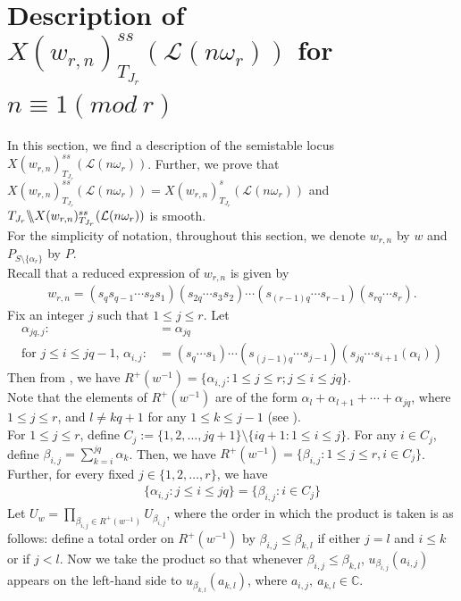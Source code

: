 \documentclass[12pt,reqno]{amsart}
\numberwithin{equation}{section}
\theoremstyle{definition}
\newcommand{\GmodX}[3]{#1 \backslash\mkern-6mu\backslash #2^{ss}_{#1}(#3)}
\begin{document}
	 \section{Description of  $X(w_{r,n})^{ss}_{T_{J_{r}}}(\mathcal{L}(n\omega_{r}))$ for $n\equiv1 (mod \ r)$} In this section, we find a description of the semistable locus $X(w_{r,n})^{ss}_{T_{J_{r}}}(\mathcal{L}(n\omega_{r}))$. Further, we prove that $X(w_{r,n})^{ss}_{T_{J_{r}}}(\mathcal{L}(n\omega_{r}))=X(w_{r,n})^{s}_{T_{J_{r}}}(\mathcal{L}(n\omega_{r}))$ and  $\GmodX{T_{J_{r}}}{X(w_{r,n})}{\mathcal{L}(n\omega_{r})}$ is smooth.\\
 For the simplicity of notation, throughout this section, we denote $w_{r,n}$ by $w$ and $P_{S\setminus\{\alpha_{r}\}}$ by $P$.\\  Recall that a reduced expression of $w_{r,n}$ is given by
 \begin{align*}
 	w_{r,n}=(s_{q}s_{q-1}\cdots s_{2}s_{1})(s_{2q}\cdots s_{3}s_{2})\cdots (s_{(r-1)q}\cdots s_{r-1})(s_{rq}\cdots s_{r}).
 \end{align*}
Fix an integer $j$ such that $1\leq j\leq r$. Let
\begin{align*}
	\alpha_{jq,j}:&=\alpha_{jq}\\
	\text{for $j\leq i\leq jq-1$, }\alpha_{i,j}:&=(s_{q}\cdots s_{1})\cdots(s_{(j-1)q}\cdots s_{j-1})(s_{jq}\cdots s_{i+1}(\alpha_{i}))
\end{align*} 
Then from \cite[Lemma 8.3.2(i)]{springer}, we have $R^{+}(w^{-1})=\{\alpha_{i,j}:1\leq j\leq r;j\leq i\leq jq\}$.\\ Note that the elements of $R^{+}(w^{-1})$ are of the form 
$\alpha_{l}+\alpha_{l+1}+\cdots+\alpha_{jq}$, where
$1\leq j\leq r$, and $l\neq kq+1$ for any $1\leq k\leq j-1$ (see \cite[Lemma 2.4]{sskannan}).\\
For $1\leq j\leq r$, define $C_{j}:=\{1,2,\ldots,jq+1\}\setminus\{iq+1: 1\leq i\leq j\}$. For any  $i\in C_{j}$, define $\beta_{i,j}=\sum_{k=i}^{jq}\alpha_{k}$. Then, we have $R^{+}(w^{-1})=\{\beta_{i,j}:1\leq j\leq r, i\in C_{j}\}$. \\
Further, for every fixed $j\in\{1,2,\ldots,r\}$, we have 
\begin{align}\label{Special eq 2}
	\{\alpha_{i,j}:j\leq i\leq jq\}=\{\beta_{i,j}:i\in C_{j}\}
\end{align}
 Let $U_{w}=\prod_{\beta_{i,j}\in R^{+}(w^{-1}) }U_{\beta_{i,j}}$, where the order in which the product is taken is as follows: define a total order on $R^{+}(w^{-1})$ by $\beta_{i,j}\leq \beta_{k,l}$ if either $j=l$ and $i\leq k$ or if $j<l$. Now we take the product so that whenever $\beta_{i,j}\leq \beta_{k,l}$, $u_{\beta_{i,j}}(a_{i,j})$ appears on the left-hand side to $u_{\beta_{k,l}}(a_{k,l})$, where $a_{i,j},\ a_{k,l}\in\mathbb{C}$.
\end{document}
